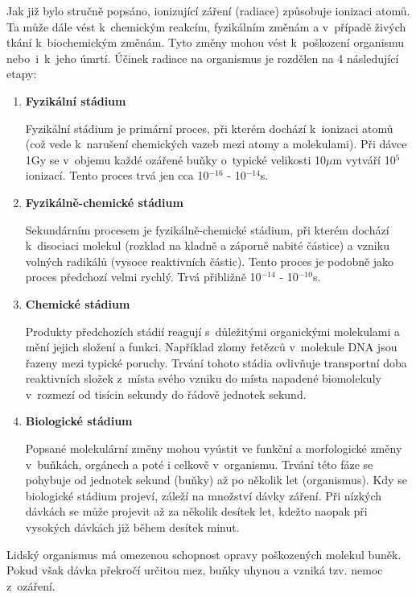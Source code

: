 Jak již bylo stručně popsáno, ionizující záření (radiace) způsobuje
ionizaci atomů. Ta může dále vést k~chemickým reakcím, fyzikálním
změnám a v~případě živých tkání k~biochemickým změnám. Tyto změny
mohou vést k~poškození organismu nebo~i~k~jeho úmrtí. Účinek radiace
na organismus je rozdělen na 4 následující etapy: \cite{bioZarUllman}
\newpage
\begin{enumerate}
	\item \textbf{Fyzikální stádium}
	
		Fyzikální stádium je primární proces, při kterém
dochází k~ionizaci atomů (což vede k~narušení chemických vazeb mezi
atomy a molekulami). Při dávce 1Gy se v~objemu každé ozářené buňky
o~typické velikosti 10$\mu$m vytváří 10$^5$ ionizací. Tento proces
trvá jen cca 10$^{-16}$ - 10$^{-14}$s.
		
	\item \textbf{Fyzikálně-chemické stádium}
	
	Sekundárním procesem je fyzikálně-chemické stádium, při kterém
dochází k~disociaci molekul (rozklad na kladně a záporně nabité
částice) a vzniku volných radikálů (vysoce reaktivních částic). Tento
proces je podobně jako proces předchozí velmi rychlý. Trvá přibližně
10$^{-14}$ - 10$^{-10}$s.
	
	\item \textbf{Chemické stádium}
	
	Produkty předchozích stádií reagují s~důležitými organickými
molekulami a mění jejich složení a funkci. Například zlomy řetězců
v~molekule DNA jsou řazeny mezi typické poruchy. Trvání tohoto stádia
ovlivňuje transportní doba reaktivních složek z~místa svého vzniku do
místa napadené biomolekuly v~rozmezí od tisícin sekundy do řádově
jednotek sekund.
	
	\item \textbf{Biologické stádium}
	
	Popsané molekulární změny mohou vyústit ve funkční a
morfologické změny v~buňkách, orgánech a poté i celkově
v~organismu. Trvání této fáze se pohybuje od jednotek sekund (buňky)
až po několik let (organismus). Kdy se biologické stádium projeví,
záleží na množství dávky záření. Při nízkých dávkách se může projevit
až za několik desítek let, kdežto naopak při vysokých dávkách již
během desítek minut.
\end{enumerate}

Lidský organismus má omezenou schopnost opravy poškozených molekul
buněk. Pokud však dávka překročí určitou mez, buňky uhynou a vzniká
tzv. nemoc z~ozáření.



